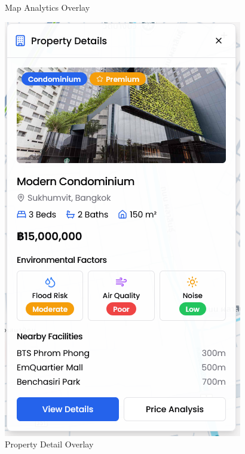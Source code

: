 \begin{figure}[h]
\begin{minipage}[b]{0.45\textwidth}
\caption{Map Analytics Overlay}
\label{fig:map-page-analytic}
\end{minipage} \hspace{0.05\textwidth}
\begin{minipage}[b]{0.45\textwidth}
\centering
\includegraphics[width=\textwidth]{assets/ui/map-page-property-detail.png}
\caption{Property Detail Overlay}
\label{fig:map-page-property-detail}
\end{minipage}
\end{figure}

